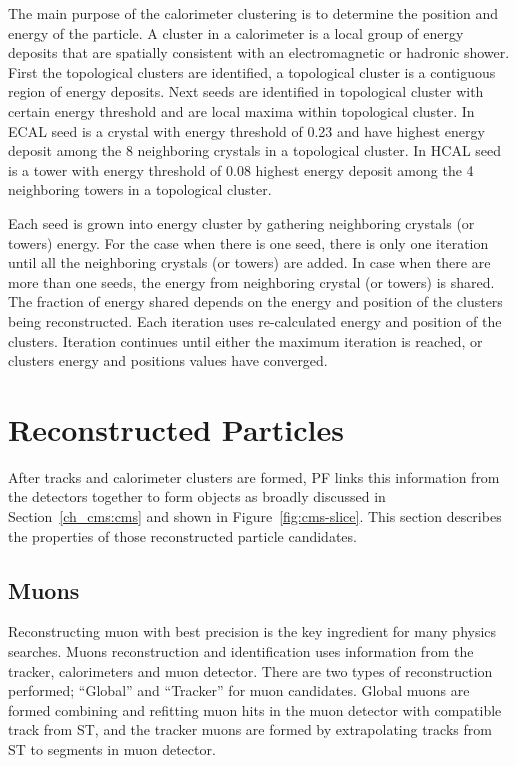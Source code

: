 The main purpose of the calorimeter clustering is to determine the position and
energy of the particle. A cluster in a calorimeter is a local group of
energy deposits that are spatially consistent with an electromagnetic
or hadronic shower. First the topological
clusters are identified, a topological cluster is a contiguous region of energy
deposits. Next seeds are identified in topological cluster with certain energy
threshold and are local maxima within topological cluster.
In \gls{ECAL} seed is a crystal with energy threshold of 0.23 \GeV{}
and have highest energy deposit among the 8 neighboring
crystals in a topological cluster.
In \gls{HCAL} seed is a tower with energy threshold of 0.08 \GeV{} highest
energy deposit among the 4 neighboring towers in a topological cluster.

Each seed is grown into energy cluster by gathering neighboring crystals (or towers)
energy.
For the case when there is one seed, there is only one
iteration until all the neighboring crystals (or towers) are added.
In case when there are more than one seeds,
the energy from neighboring crystal (or towers) is shared.
The fraction of energy shared depends on the energy and position of the
clusters being reconstructed.
Each iteration uses re-calculated energy and position of the clusters.
Iteration continues until either
the maximum iteration is reached, or clusters
energy and positions values have converged.

\section{
  Reconstructed Particles
 }

After tracks and calorimeter clusters are formed, \gls{PF} links this information
from the detectors together to form objects as broadly discussed in
Section~\ref{ch_cms:cms} and shown in Figure~\ref{fig:cms-slice}. This section
describes the properties of those reconstructed particle candidates.

\subsection{
  Muons
}\label{ch_reco:muons}

Reconstructing muon with best precision is the key ingredient for many physics
searches. Muons reconstruction and identification uses information from the tracker,
calorimeters and muon detector. There are two types of reconstruction performed;
``Global'' and ``Tracker'' for muon candidates. Global muons are formed combining and refitting
muon hits in the muon detector with compatible track from \gls{ST}, and the tracker muons
are formed by extrapolating tracks from \gls{ST} to segments in muon detector.

